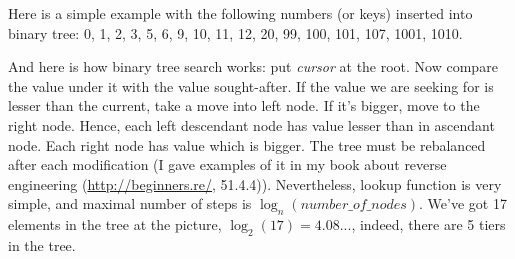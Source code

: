 Here is a simple example with the following numbers (or keys) inserted into binary tree:
0, 1, 2, 3, 5, 6, 9, 10, 11, 12, 20, 99, 100, 101, 107, 1001, 1010.



And here is how binary tree search works: put \textit{cursor} at the root. Now compare the value under it with the value sought-after.
If the value we are seeking for is lesser than the current, take a move into left node. If it's bigger, move to the right node.
Hence, each left descendant node has value lesser than in 
ascendant node.
Each right node has value which is bigger.
The tree must be rebalanced after each modification (I gave examples of it in my book about reverse engineering (\url{http://beginners.re/}, 51.4.4)).
Nevertheless, lookup function is very simple, and maximal number of steps is $\log_n(number\_of\_nodes)$.
We've got 17 elements in the tree at the picture, $\log_2(17)=4.08...$, indeed, there are 5 tiers in the tree.

